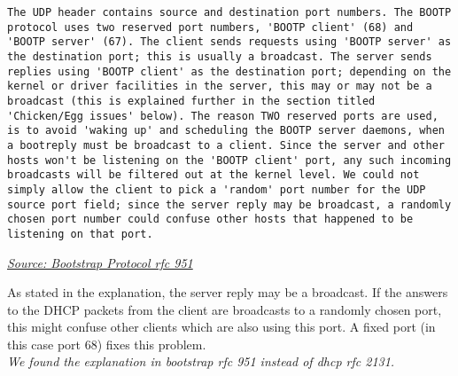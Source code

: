 \begin{lstlisting}
The UDP header contains source and destination port numbers. The BOOTP protocol uses two reserved port numbers, 'BOOTP client' (68) and 'BOOTP server' (67). The client sends requests using 'BOOTP server' as the destination port; this is usually a broadcast. The server sends replies using 'BOOTP client' as the destination port; depending on the kernel or driver facilities in the server, this may or may not be a broadcast (this is explained further in the section titled 'Chicken/Egg issues' below). The reason TWO reserved ports are used, is to avoid 'waking up' and scheduling the BOOTP server daemons, when a bootreply must be broadcast to a client. Since the server and other hosts won't be listening on the 'BOOTP client' port, any such incoming broadcasts will be filtered out at the kernel level. We could not simply allow the client to pick a 'random' port number for the UDP source port field; since the server reply may be broadcast, a randomly chosen port number could confuse other hosts that happened to be listening on that port.
\end{lstlisting}
\href{https://www.ietf.org/rfc/rfc951.txt}{\color{red}\textit{Source: Bootstrap Protocol rfc 951}}
\newline

As stated in the explanation, the server reply may be a broadcast. If the answers to the DHCP packets from the client are broadcasts to a randomly chosen port, this might confuse other clients which are also using this port. A fixed port (in this case port 68) fixes this problem. \\


\textit{We found the explanation in bootstrap rfc 951 instead of dhcp rfc 2131.}
